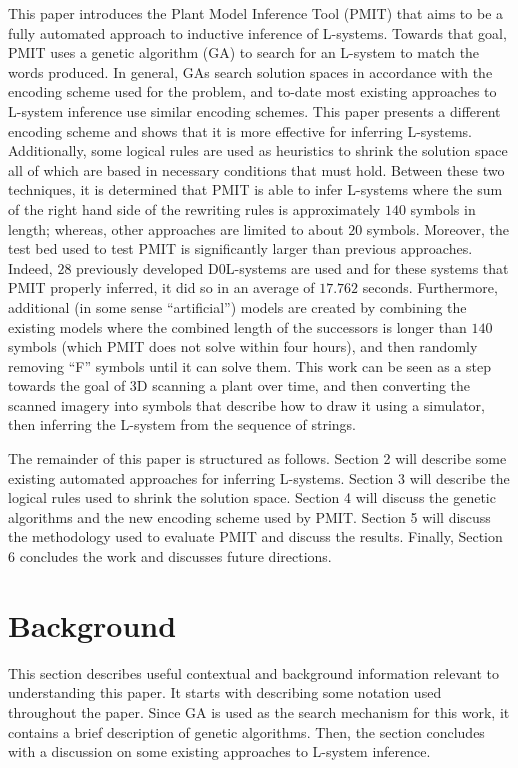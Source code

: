 \documentclass{llncs}
\begin{document}
	This paper introduces the Plant Model Inference Tool (PMIT) that aims to be a fully automated approach to inductive inference of L-systems. Towards that goal, PMIT uses a genetic algorithm (GA) to search for an L-system to match the words produced. In general, GAs search solution spaces in accordance with the encoding scheme used for the problem, and to-date most existing approaches to L-system inference use similar encoding schemes. This paper presents a different encoding scheme and shows that it is more effective for inferring L-systems. Additionally, some logical rules are used as heuristics to shrink the solution space all of which are based in necessary conditions that must hold. Between these two techniques, it is determined that PMIT is able to infer L-systems where the sum of the right hand side of the rewriting rules is approximately $140$ symbols in length; whereas, other approaches are limited to about $20$ symbols. Moreover, the test bed used to test PMIT is significantly larger than previous approaches. Indeed, $28$ previously developed D0L-systems are used and for these systems that PMIT properly inferred, it did so in an average of $17.762$ seconds. Furthermore, additional (in some sense ``artificial'') models are created by combining the existing models where the combined length of the successors is longer than $140$ symbols (which PMIT does not solve within four hours), and then randomly removing ``F'' symbols until it can solve them. This work can be seen as a step towards the goal of 3D scanning a plant over time, and then converting the scanned imagery into symbols that describe how to draw it using a simulator, then inferring the L-system from the sequence of strings. 
	
	The remainder of this paper is structured as follows. Section 2 will describe some existing automated approaches for inferring L-systems. Section 3 will describe the logical rules used to shrink the solution space. Section 4 will discuss the genetic algorithms and the new encoding scheme used by PMIT. Section 5 will discuss the methodology used to evaluate PMIT and discuss the results. Finally, Section 6 concludes the work and discusses future directions.
	
	\section{Background}
	
	This section describes useful contextual and background information relevant to understanding this paper. It starts with describing some notation used throughout the paper. Since GA is used as the search mechanism for this work, it contains a brief description of genetic algorithms. Then, the section concludes with a discussion on some existing approaches to L-system inference. 
	
\end{document}
